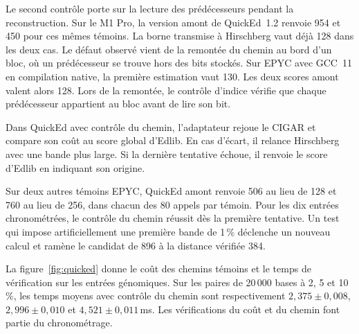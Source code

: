 Le second contrôle porte sur la lecture des prédécesseurs pendant la reconstruction. Sur le M1 Pro, la version amont de QuickEd~1.2 renvoie 954 et 450 pour ces mêmes témoins. La borne transmise à Hirschberg vaut déjà 128 dans les deux cas. Le défaut observé vient de la remontée du chemin au bord d'un bloc, où un prédécesseur se trouve hors des bits stockés. Sur EPYC avec GCC~11 en compilation native, la première estimation vaut 130. Les deux scores amont valent alors 128. Lors de la remontée, le contrôle d'indice vérifie que chaque prédécesseur appartient au bloc avant de lire son bit.

Dans QuickEd avec contrôle du chemin, l'adaptateur rejoue le CIGAR et compare son coût au score global d'Edlib. En cas d'écart, il relance Hirschberg avec une bande plus large. Si la dernière tentative échoue, il renvoie le score d'Edlib en indiquant son origine.

Sur deux autres témoins EPYC, QuickEd amont renvoie 506 au lieu de 128 et 760 au lieu de 256, dans chacun des 80 appels par témoin. Pour les dix entrées chronométrées, le contrôle du chemin réussit dès la première tentative. Un test qui impose artificiellement une première bande de 1\,\% déclenche un nouveau calcul et ramène le candidat de 896 à la distance vérifiée 384.

\FloatBarrier
La figure~\ref{fig:quicked} donne le coût des chemins témoins et le temps de vérification sur les entrées génomiques. Sur les paires de 20\,000 bases à 2, 5 et 10\,\%, les temps moyens avec contrôle du chemin sont respectivement \(2{,}375\pm0{,}008\), \(2{,}996\pm0{,}010\) et \(4{,}521\pm0{,}011\)\,ms. Les vérifications du coût et du chemin font partie du chronométrage.




